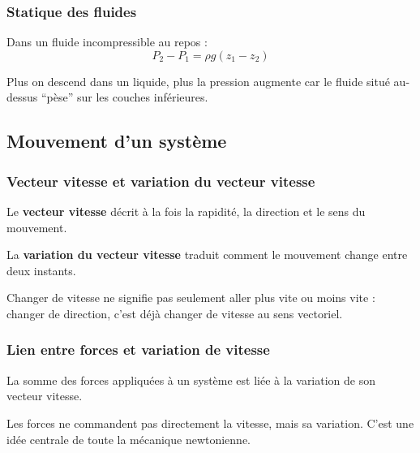 \documentclass[11pt,a4paper]{article}
\begin{document}
\subsubsection{Statique des fluides}

\begin{proprbox}
Dans un fluide incompressible au repos :
\[
P_2-P_1=\rho g(z_1-z_2)
\]
\end{proprbox}

\begin{sensbox}
Plus on descend dans un liquide, plus la pression augmente car le fluide situé au-dessus ``pèse'' sur les couches inférieures.
\end{sensbox}

\subsection{Mouvement d'un système}

\subsubsection{Vecteur vitesse et variation du vecteur vitesse}

\begin{definitionbox}
Le \textbf{vecteur vitesse} décrit à la fois la rapidité, la direction et le sens du mouvement.
\end{definitionbox}

\begin{definitionbox}
La \textbf{variation du vecteur vitesse} traduit comment le mouvement change entre deux instants.
\end{definitionbox}

\begin{sensbox}
Changer de vitesse ne signifie pas seulement aller plus vite ou moins vite : changer de direction, c'est déjà changer de vitesse au sens vectoriel.
\end{sensbox}

\subsubsection{Lien entre forces et variation de vitesse}

\begin{proprbox}
La somme des forces appliquées à un système est liée à la variation de son vecteur vitesse.
\end{proprbox}

\begin{sensbox}
Les forces ne commandent pas directement la vitesse, mais sa variation.  
C'est une idée centrale de toute la mécanique newtonienne.
\end{sensbox}
\end{document}
